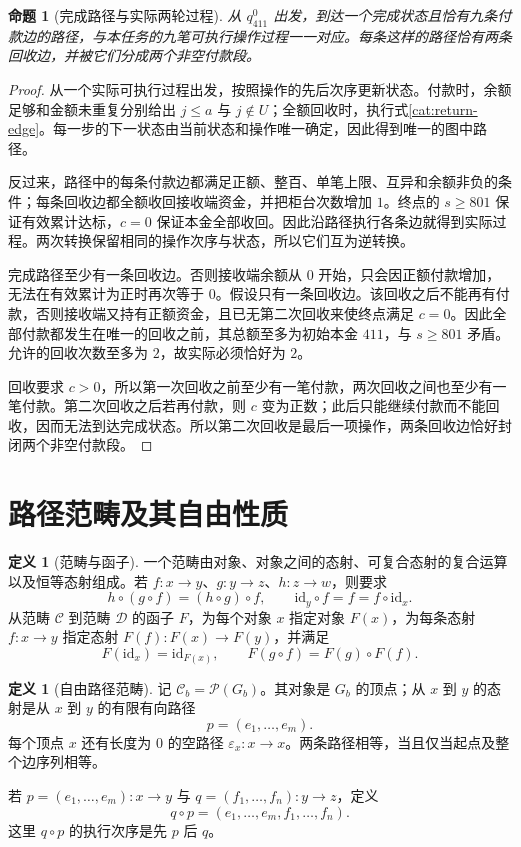 \documentclass[UTF8,a4paper]{ctexbook}
\newtheorem{proposition}[theorem]{命题}
\theoremstyle{definition}
\newtheorem{definition}[theorem]{定义}
\numberwithin{equation}{chapter}
\newcommand{\1}{\mathbf{1}}
\begin{document}
\begin{proposition}[完成路径与实际两轮过程]\label{cat:execution}
从 $q_{411}^0$ 出发，到达一个完成状态且恰有九条付款边的路径，与本任务的九笔可执行操作过程一一对应。每条这样的路径恰有两条回收边，并被它们分成两个非空付款段。
\end{proposition}
\begin{proof}
从一个实际可执行过程出发，按照操作的先后次序更新状态。付款时，余额足够和金额未重复分别给出 $j\le a$ 与 $j\notin U$；全额回收时，执行式\eqref{cat:return-edge}。每一步的下一状态由当前状态和操作唯一确定，因此得到唯一的图中路径。

反过来，路径中的每条付款边都满足正额、整百、单笔上限、互异和余额非负的条件；每条回收边都全额收回接收端资金，并把柜台次数增加 $1$。终点的 $s\ge801$ 保证有效累计达标，$c=0$ 保证本金全部收回。因此沿路径执行各条边就得到实际过程。两次转换保留相同的操作次序与状态，所以它们互为逆转换。

完成路径至少有一条回收边。否则接收端余额从 $0$ 开始，只会因正额付款增加，无法在有效累计为正时再次等于 $0$。假设只有一条回收边。该回收之后不能再有付款，否则接收端又持有正额资金，且已无第二次回收来使终点满足 $c=0$。因此全部付款都发生在唯一的回收之前，其总额至多为初始本金 $411$，与 $s\ge801$ 矛盾。允许的回收次数至多为 $2$，故实际必须恰好为 $2$。

回收要求 $c>0$，所以第一次回收之前至少有一笔付款，两次回收之间也至少有一笔付款。第二次回收之后若再付款，则 $c$ 变为正数；此后只能继续付款而不能回收，因而无法到达完成状态。所以第二次回收是最后一项操作，两条回收边恰好封闭两个非空付款段。
\end{proof}

\section{路径范畴及其自由性质}

\begin{definition}[范畴与函子]\label{cat:category-definition}
一个范畴由对象、对象之间的态射、可复合态射的复合运算以及恒等态射组成。若 $f:x\to y$、$g:y\to z$、$h:z\to w$，则要求
\[
h\circ(g\circ f)=(h\circ g)\circ f,
\qquad
\mathrm{id}_y\circ f=f=f\circ\mathrm{id}_x.
\]
从范畴 $\mathcal C$ 到范畴 $\mathcal D$ 的函子 $F$，为每个对象 $x$ 指定对象 $F(x)$，为每条态射 $f:x\to y$ 指定态射 $F(f):F(x)\to F(y)$，并满足
\[
F(\mathrm{id}_x)=\mathrm{id}_{F(x)},\qquad
F(g\circ f)=F(g)\circ F(f).
\]
\end{definition}

\begin{definition}[自由路径范畴]\label{cat:path-category}
记 $\mathcal C_b=\mathcal P(G_b)$。其对象是 $G_b$ 的顶点；从 $x$ 到 $y$ 的态射是从 $x$ 到 $y$ 的有限有向路径
\[
p=(e_1,\ldots,e_m).
\]
每个顶点 $x$ 还有长度为 $0$ 的空路径 $\varepsilon_x:x\to x$。两条路径相等，当且仅当起点及整个边序列相等。

若 $p=(e_1,\ldots,e_m):x\to y$ 与 $q=(f_1,\ldots,f_n):y\to z$，定义
\begin{equation}\label{cat:concatenation}
q\circ p=(e_1,\ldots,e_m,f_1,\ldots,f_n).
\end{equation}
这里 $q\circ p$ 的执行次序是先 $p$ 后 $q$。
\end{definition}
\end{document}
